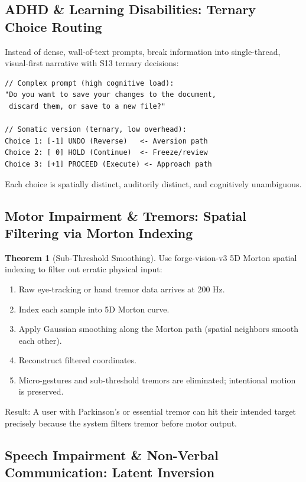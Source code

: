 \documentclass[11pt,oneside]{article}
\theoremstyle{definition}
\newtheorem{theorem}{Theorem}
\begin{document}
\subsection{ADHD \& Learning Disabilities: Ternary Choice Routing}

Instead of dense, wall-of-text prompts, break information into single-thread, visual-first narrative with S13 ternary decisions:

\begin{lstlisting}
// Complex prompt (high cognitive load):
"Do you want to save your changes to the document,
 discard them, or save to a new file?"

// Somatic version (ternary, low overhead):
Choice 1: [-1] UNDO (Reverse)   <- Aversion path
Choice 2: [ 0] HOLD (Continue)  <- Freeze/review
Choice 3: [+1] PROCEED (Execute) <- Approach path
\end{lstlisting}

Each choice is spatially distinct, auditorily distinct, and cognitively unambiguous.

\subsection{Motor Impairment \& Tremors: Spatial Filtering via Morton Indexing}

\begin{theorem}[Sub-Threshold Smoothing]
Use forge-vision-v3 5D Morton spatial indexing to filter out erratic physical input:

\begin{enumerate}
  \item Raw eye-tracking or hand tremor data arrives at 200 Hz.
  \item Index each sample into 5D Morton curve.
  \item Apply Gaussian smoothing along the Morton path (spatial neighbors smooth each other).
  \item Reconstruct filtered coordinates.
  \item Micro-gestures and sub-threshold tremors are eliminated; intentional motion is preserved.
\end{enumerate}

Result: A user with Parkinson's or essential tremor can hit their intended target precisely because the system filters tremor before motor output.
\end{theorem}

\subsection{Speech Impairment \& Non-Verbal Communication: Latent Inversion}
\end{document}

